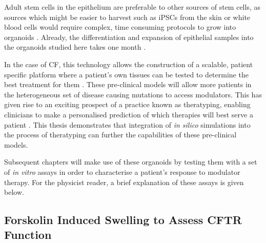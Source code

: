 Adult stem cells in the epithelium are preferable to other sources of stem cells, as sources which might be easier to harvest such as iPSCs from the skin or white blood cells would require complex, time consuming protocols to grow into organoids \cite{wong2012}. Already, the differentiation and expansion of epithelial samples into the organoids studied here takes one month \cite{sato2011}.

In the case of CF, this technology allows the construction of a scalable, patient specific platform where a patient's own tissues can be tested to determine the best treatment for them \cite{keegan2021, sato2011}. These pre-clinical models will allow more patients in the heterogeneous set of disease causing mutations to access modulators. This has given rise to an exciting prospect of a practice known as theratyping, enabling clinicians to make a personalised prediction of which therapies will best serve a patient \cite{clancy2019, wong2022, wong2022a, ciciriello2022}. This thesis demonstrates that integration of \textit{in silico} simulations into the process of theratyping can further the capabilities of these pre-clinical models.

Subsequent chapters will make use of these organoids by testing them with a set of \textit{in vitro} assays in order to characterise a patient's response to modulator therapy. For the physicist reader, a brief explanation of these assays is given below.

\subsection{Forskolin Induced Swelling to Assess CFTR Function}

